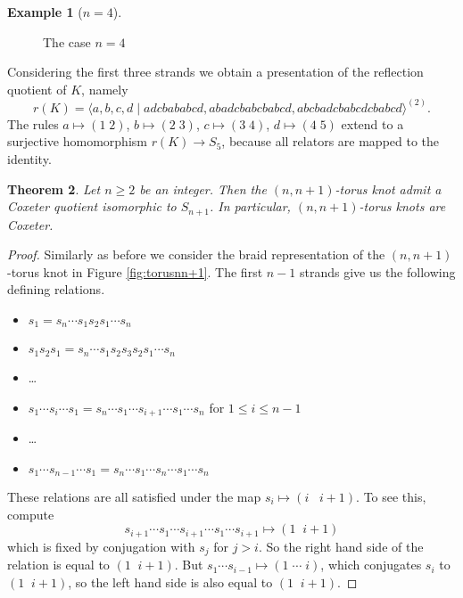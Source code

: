 \documentclass{article}
\newtheorem{theorem}{Theorem}[section]
\theoremstyle{definition}
\newtheorem{example}[theorem]{Example}
\begin{document}
\begin{example}[$n=4$]
\begin{figure}[ht]
\caption{The case $n = 4$}
\label{fig:torus45}
\end{figure}

Considering the first three strands we obtain a presentation of the reflection quotient of $K$, namely
$$r(K) = \langle a, b, c, d \; | \; adcbababcd, abadcbabcbabcd, abcbadcbabcdcbabcd \rangle^{(2)}.$$
The rules $a \mapsto (1 \; 2)$, $b \mapsto (2 \; 3)$, $c \mapsto (3 \; 4)$, $d \mapsto (4 \; 5)$ extend to a surjective homomorphism $r(K) \rightarrow S_5$, because all relators are mapped to the identity.
\end{example}

\begin{theorem}
Let $n \geq 2$ be an integer. Then the $(n, n+1)$-torus knot admit a Coxeter quotient isomorphic to $S_{n+1}$. In particular, $(n, n+1)$-torus knots are Coxeter.
\end{theorem}

\begin{proof} Similarly as before we consider the braid representation of the $(n, n+1)$-torus knot in Figure \ref{fig:torusnn+1}. The first $n-1$ strands give us the following defining relations.
\begin{itemize}
\setlength\itemsep{0em}
\item $s_1 = s_n \cdots s_1 s_2 s_1 \cdots s_n$
\item $s_1s_2s_1 = s_n \cdots s_1 s_2 s_3 s_2 s_1 \cdots s_n$
\item \dots
\item $s_1 \cdots s_i \cdots s_1 = s_n \cdots s_1 \cdots s_{i+1} \cdots s_1 \cdots s_n$ for $1 \leq i \leq n-1$
\item \dots
\item $s_1 \cdots s_{n-1} \cdots s_1 = s_n \cdots s_1 \cdots s_n \cdots s_1 \cdots s_n$
\end{itemize}
These relations are all satisfied under the map $s_i \mapsto (i \;\;\; i+1)$. To see this, compute 
$$s_{i+1} \cdots s_1 \cdots s_{i+1} \cdots s_1 \cdots s_{i+1} \mapsto (1 \;\; i+1)$$
which is fixed by conjugation with $s_j$ for $j > i$. So the right hand side of the relation is equal to $(1 \; \; i + 1)$. But $s_1 \cdots s_{i-1} \mapsto (1 \; \cdots \; i)$, which conjugates $s_i$ to $(1 \; \; i + 1)$, so the left hand side is also equal to $(1 \; \; i + 1)$. 
\end{proof}
\end{document}
